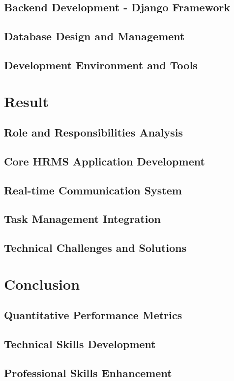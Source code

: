 \documentclass[a4paper, 11pt, oneside]{report}
\begin{document}
\section{Backend Development - Django Framework}
\section{Database Design and Management}
\section{Development Environment and Tools}


\chapter{Result}
\section{Role and Responsibilities Analysis}
\section{Core HRMS Application Development}
\section{Real-time Communication System}
\section{Task Management Integration}
\section{Technical Challenges and Solutions}


\chapter{Conclusion}
\section{Quantitative Performance Metrics}
\section{Technical Skills Development}
\section{Professional Skills Enhancement}
\end{document}
